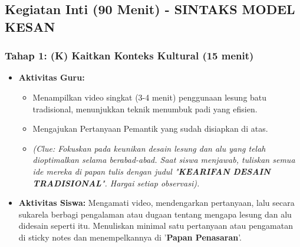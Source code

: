 \documentclass[a4paper,12pt]{article}
\begin{document}
\subsection{Kegiatan Inti (90 Menit) - SINTAKS MODEL KESAN}

\subsubsection{Tahap 1: (K) Kaitkan Konteks Kultural (15 menit)}
\begin{itemize}
\item \textbf{Aktivitas Guru:}
    \begin{itemize}
    \item Menampilkan video singkat (3-4 menit) penggunaan lesung batu tradisional, menunjukkan teknik menumbuk padi yang efisien.
    \item Mengajukan Pertanyaan Pemantik yang sudah disiapkan di atas.
    \item \textit{(Clue: Fokuskan pada keunikan desain lesung dan alu yang telah dioptimalkan selama berabad-abad. Saat siswa menjawab, tuliskan semua ide mereka di papan tulis dengan judul "\textbf{KEARIFAN DESAIN TRADISIONAL}". Hargai setiap observasi).}
    \end{itemize}
\item \textbf{Aktivitas Siswa:} Mengamati video, mendengarkan pertanyaan, lalu secara sukarela berbagi pengalaman atau dugaan tentang mengapa lesung dan alu didesain seperti itu. Menuliskan minimal satu pertanyaan atau pengamatan di sticky notes dan menempelkannya di '\textbf{Papan Penasaran}'.
\end{itemize}
\end{document}
